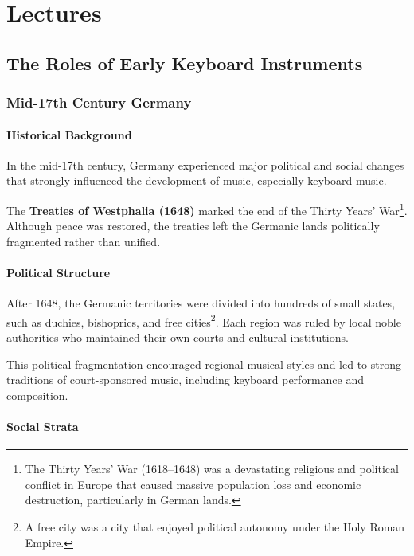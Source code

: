 \documentclass[math,code]{amznotes}
\theoremstyle{remark}
\begin{document}
\tableofcontents

\chapter{Lectures}
\section{The Roles of Early Keyboard Instruments}
\subsection{Mid-17th Century Germany}

\subsubsection{Historical Background}

In the mid-17th century, Germany experienced major political and social changes that strongly influenced the development of music, especially keyboard music.

The \textbf{Treaties of Westphalia (1648)} marked the end of the Thirty Years' War\footnote{The Thirty Years' War (1618--1648) was a devastating religious and political conflict in Europe that caused massive population loss and economic destruction, particularly in German lands.}. 
Although peace was restored, the treaties left the Germanic lands politically fragmented rather than unified.
\subsubsection{Political Structure}

After 1648, the Germanic territories were divided into hundreds of small states, such as duchies, bishoprics, and free cities\footnote{A free city was a city that enjoyed political autonomy under the Holy Roman Empire.}. 
Each region was ruled by local noble authorities who maintained their own courts and cultural institutions.

This political fragmentation encouraged regional musical styles and led to strong traditions of court-sponsored music, including keyboard performance and composition.

\subsubsection{Social Strata}
\end{document}
